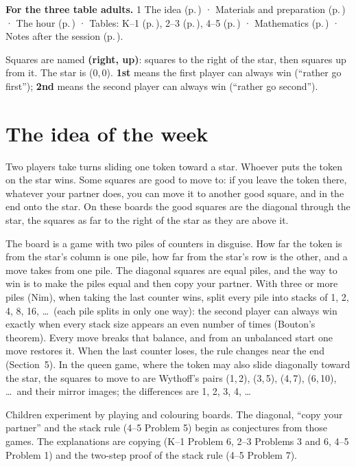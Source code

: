 \documentclass[10pt]{article}
\begin{document}
\textbf{For the three table adults.} 1 The idea (p.\,\pageref{s1}) \;· Materials and preparation (p.\,\pageref{s2}) \;· The hour (p.\,\pageref{s3}) \;· Tables: K--1 (p.\,\pageref{k1}), 2--3 (p.\,\pageref{m23}), 4--5 (p.\,\pageref{u45}) \;· Mathematics (p.\,\pageref{s5}) \;· Notes after the session (p.\,\pageref{s6}).

Squares are named \textbf{(right, up)}: squares to the right of the star, then squares up from it. The star is (0,\,0). \textbf{1st} means the first player can always win (``rather go first''); \textbf{2nd} means the second player can always win (``rather go second'').

\section{The idea of the week}\label{s1}

Two players take turns sliding one token toward a star. Whoever puts the token on the star wins. Some squares are good to move to: if you leave the token there, whatever your partner does, you can move it to another good square, and in the end onto the star. On these boards the good squares are the diagonal through the star, the squares as far to the right of the star as they are above it.

The board is a game with two piles of counters in disguise. How far the token is from the star's column is one pile, how far from the star's row is the other, and a move takes from one pile. The diagonal squares are equal piles, and the way to win is to make the piles equal and then copy your partner. With three or more piles (Nim), when taking the last counter wins, split every pile into stacks of 1, 2, 4, 8, 16, \dots\ (each pile splits in only one way): the second player can always win exactly when every stack size appears an even number of times (Bouton's theorem). Every move breaks that balance, and from an unbalanced start one move restores it. When the last counter loses, the rule changes near the end (Section~5). In the queen game, where the token may also slide diagonally toward the star, the squares to move to are Wythoff's pairs (1,\,2), (3,\,5), (4,\,7), (6,\,10), \dots\ and their mirror images; the differences are 1, 2, 3, 4, \dots

Children experiment by playing and colouring boards. The diagonal, ``copy your partner'' and the stack rule (4--5 Problem 5) begin as conjectures from those games. The explanations are copying (K--1 Problem 6, 2--3 Problems 3 and 6, 4--5 Problem 1) and the two-step proof of the stack rule (4--5 Problem 7).
\end{document}
